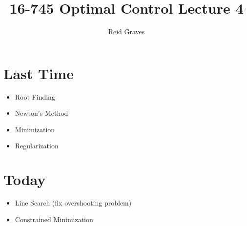 \documentclass[11pt]{article}
\title{16-745 Optimal Control Lecture 4}
\author{Reid Graves}
\begin{document}
\maketitle

\section{Last Time}
\begin{itemize}
    \item Root Finding
    \item Newton's Method
    \item Minimization
    \item Regularization
\end{itemize}

\section{Today}
\begin{itemize}
    \item Line Search (fix overshooting problem)
    \item Constrained Minimization
\end{itemize}
\end{document}
